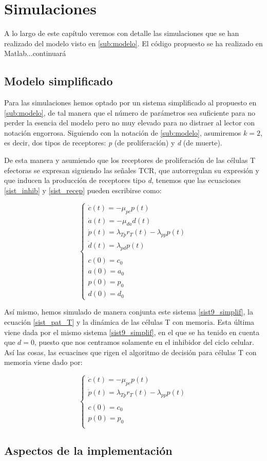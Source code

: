 
\chapter{Simulaciones}
\label{cap:simulaciones}

A lo largo de este capítulo veremos con detalle las simulaciones que se han realizado del modelo visto en \ref{sub:modelo}. El código propuesto se ha realizado en Matlab...continuará

\section{Modelo simplificado}

Para las simulaciones hemos optado por un sistema simplificado al propuesto en \ref{sub:modelo}, de tal manera que el número de parámetros sea suficiente para no perder la esencia del modelo pero no muy elevado para no distraer al lector con notación engorrosa. Siguiendo con la notación de \ref{sub:modelo}, asumiremos $k=2$, es decir, dos tipos de receptores: \textit{p} (de proliferación) y \textit{d} (de muerte).

De esta manera y asumiendo que los receptores de proliferación de las células T efectoras se expresan siguiendo las señales TCR, que autorregulan su expresión y que inducen la producción de receptores tipo \textit{d}, tenemos que las ecuaciones \ref{sist_inhib} y \ref{sist_recep} pueden escribirse como:

\begin{equation}
	\label{sist9_simplif}
	\left\{ \begin{array}{l}
	\dot{c}(t) = -\mu_{pc}p(t) \\
	\dot{a}(t) = -\mu_{da}d(t)  \\
	\dot{p}(t) = \lambda_{Tp}r_{T}(t) - \lambda_{pp}p(t) \\
	\dot{d}(t) = \lambda_{pd}p(t) \\
	\\
	c(0)=c_0 \\
	a(0)=a_0 \\
	p(0)=p_0 \\
	d(0)=d_0 
	\end{array}
	\right.
\end{equation}

Así mismo, hemos simulado de manera conjunta este sistema \ref{sist9_simplif}, la ecuación \ref{sist_pat_T} y la dinámica de las células T con memoria. Esta última viene dada por el mismo sistema \ref{sist9_simplif}, en el que se ha tenido en cuenta que $d=0$, puesto que nos centramos solamente en el inhibidor del ciclo celular. Así las cosas, las ecuacines que rigen el algoritmo de decisión para células T con memoria viene dado por: 

\begin{equation}
	\label{sist9_simplif}
	\left\{ \begin{array}{l}
	\dot{c}(t) = -\mu_{pc}p(t) \\
	\dot{p}(t) = \lambda_{Tp}r_{T}(t) - \lambda_{pp}p(t) \\
	\\
	c(0)=c_0 \\
	p(0)=p_0 \\
	\end{array}
	\right.
\end{equation}


\section{Aspectos de la implementación}


